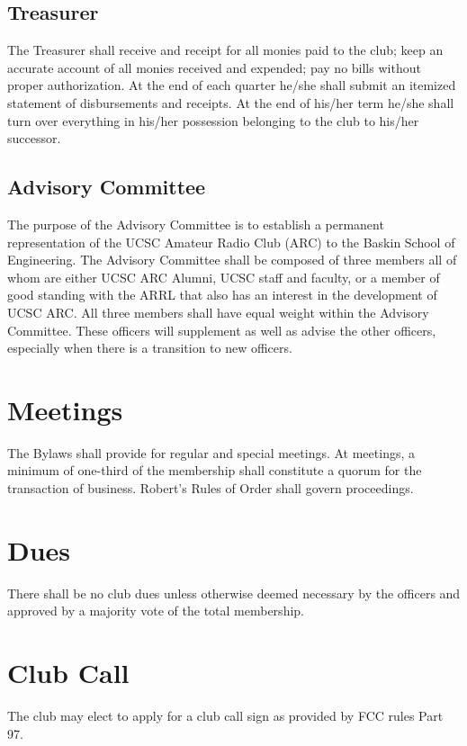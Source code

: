 \documentclass{article}
\begin{document}
\subsection{Treasurer}

The Treasurer shall receive and receipt for all monies paid to the club; keep an accurate account of all monies received and expended; pay no bills without proper authorization. At the end of each quarter he/she shall submit an itemized statement of disbursements and receipts. At the end of his/her term he/she shall turn over everything in his/her possession belonging to the club to his/her successor.

\subsection{Advisory Committee}

The purpose of the Advisory Committee is to establish a permanent representation of the UCSC Amateur Radio Club (ARC) to the Baskin School of Engineering. The Advisory Committee shall be composed of three members all of whom are either UCSC ARC Alumni, UCSC staff and faculty, or a member of good standing with the ARRL that also has an interest in the development of UCSC ARC. All three members shall have equal weight within the Advisory Committee. These officers will supplement as well as advise the other officers, especially when there is a transition to new officers.
\noindent
\section{Meetings}
The Bylaws shall provide for regular and special meetings. At meetings, a minimum of one-third of the membership shall constitute a quorum for the transaction of business. Robert's Rules of Order shall govern proceedings.

\section{Dues}
There shall be no club dues unless otherwise deemed necessary by the officers and approved by a majority vote of the total membership.

\section{Club Call}
The club may elect to apply for a club call sign as provided by FCC rules Part 97.\\
\end{document}
